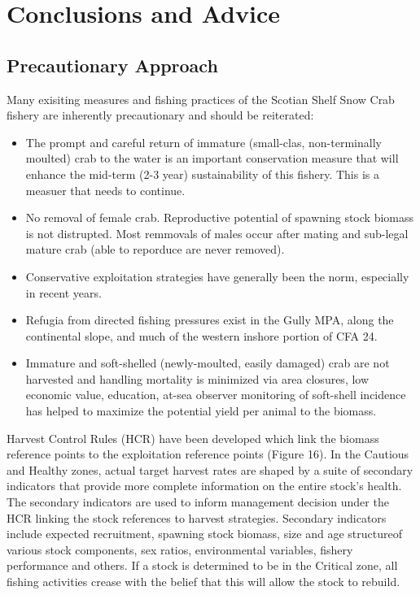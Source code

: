 \documentclass[paper=a4, fontsize=11pt]{article}
\begin{document}
\section{Conclusions and Advice}
\subsection{Precautionary Approach}
Many exisiting measures and fishing practices of the Scotian Shelf Snow Crab fishery are inherently precautionary and should be reiterated:
\begin{itemize}
  \item The prompt and careful return of immature (small-clas, non-terminally moulted) crab to the water is an important conservation measure that will enhance the mid-term (2-3 year) sustainability of this fishery. This is a measuer that needs to continue.
  \item No removal of female crab. Reproductive potential of spawning stock biomass is not distrupted. Most remmovals of males occur after mating and sub-legal mature crab (able to reporduce are never removed).
  \item Conservative exploitation strategies have generally been the norm, especially in recent years. 
  \item Refugia from directed fishing pressures exist in the Gully MPA, along the continental slope, and much of the western inshore portion of CFA 24.\
  \item Immature and soft-shelled (newly-moulted, easily damaged) crab are not harvested and handling mortality is minimized via area closures, low economic value, education, at-sea observer monitoring of soft-shell incidence has helped to maximize the potential yield per animal to the biomass. \\
 \end{itemize} 

Harvest Control Rules (HCR) have been developed which link the biomass reference points to the exploitation reference points (Figure 16). In the Cautious and Healthy zones, actual target harvest rates are shaped by a suite of secondary indicators that provide more complete information on the entire stock's health. The secondary indicators are used to inform management decision under the HCR linking the stock references to harvest strategies. Secondary indicators include expected recruitment, spawning stock biomass, size and age structureof various stock components, sex ratios, environmental variables, fishery performance and others. If a stock is determined to be in the Critical zone, all fishing activities crease with the belief that this will allow the stock to rebuild. \\
\end{document}
